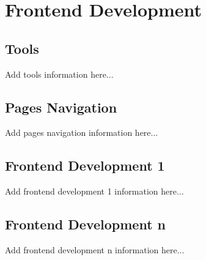 \newpage
\section{Frontend Development}
\subsection{Tools}
Add tools information here...

\subsection{Pages Navigation}
Add pages navigation information here...

\subsection{Frontend Development 1}
Add frontend development 1 information here...

\subsection{Frontend Development n}
Add frontend development n information here...